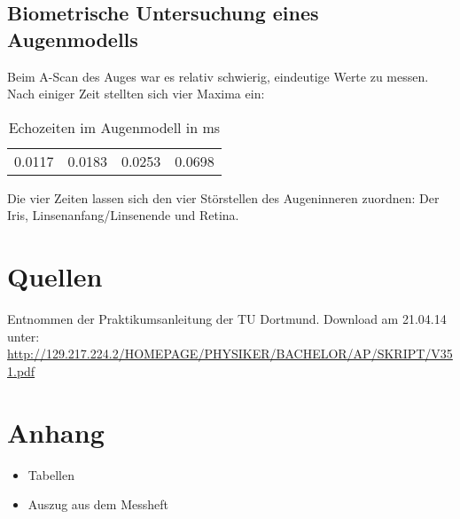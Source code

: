 \documentclass[11pt,ngerman,a4paper]{article}
\begin{document}
\subsection{Biometrische Untersuchung eines Augenmodells}
Beim A-Scan des Auges war es relativ schwierig, eindeutige Werte zu messen. Nach einiger Zeit stellten sich vier Maxima ein:
\begin{table}[h]
\centering
 \begin{tabular}{|c|c|c|c|}
 0.0117 & 0.0183 & 0.0253 & 0.0698 \\
 \end{tabular}
\caption{Echozeiten im Augenmodell in ms}
\end{table}
\newline
Die vier Zeiten lassen sich den vier Störstellen des Augeninneren zuordnen: Der Iris, Linsenanfang/Linsenende und Retina. 

\section{Quellen}
\begin{enumerate}[{[}1{]}]
\item Entnommen der Praktikumsanleitung \textit{} der TU Dortmund. Download am 21.04.14 unter:\\
 \url{http://129.217.224.2/HOMEPAGE/PHYSIKER/BACHELOR/AP/SKRIPT/V351.pdf}
\end{enumerate}

\section{Anhang}
\begin{itemize}
\item Tabellen
\item Auszug aus dem Messheft
\end{itemize}
\end{document}
